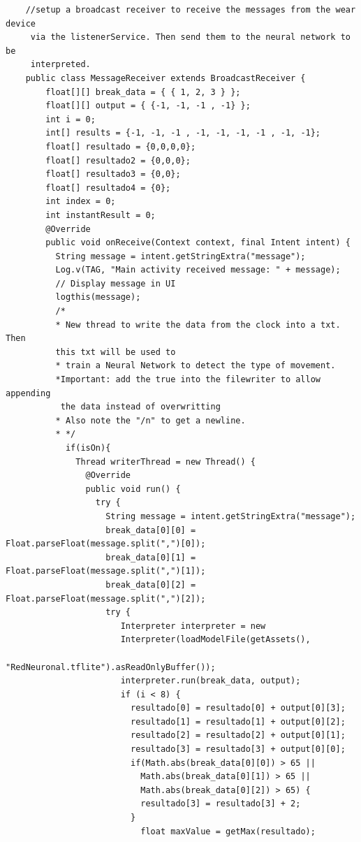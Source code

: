 \documentclass[12pt]{book}
\numberwithin{equation}{section}
\begin{document}
\begin{appendices}
\begin{verbatim}
    //setup a broadcast receiver to receive the messages from the wear device
     via the listenerService. Then send them to the neural network to be 
     interpreted.
    public class MessageReceiver extends BroadcastReceiver {
        float[][] break_data = { { 1, 2, 3 } };
        float[][] output = { {-1, -1, -1 , -1} };
        int i = 0;
        int[] results = {-1, -1, -1 , -1, -1, -1, -1 , -1, -1};
        float[] resultado = {0,0,0,0};
        float[] resultado2 = {0,0,0};
        float[] resultado3 = {0,0};
        float[] resultado4 = {0};
        int index = 0;
        int instantResult = 0;
        @Override
        public void onReceive(Context context, final Intent intent) {
          String message = intent.getStringExtra("message");
          Log.v(TAG, "Main activity received message: " + message);
          // Display message in UI
          logthis(message);
          /*
          * New thread to write the data from the clock into a txt. Then 
          this txt will be used to
          * train a Neural Network to detect the type of movement.
          *Important: add the true into the filewriter to allow appending
           the data instead of overwritting
          * Also note the "/n" to get a newline.
          * */
            if(isOn){
              Thread writerThread = new Thread() {
                @Override
                public void run() {
                  try {
                    String message = intent.getStringExtra("message");
                    break_data[0][0] = Float.parseFloat(message.split(",")[0]);
                    break_data[0][1] = Float.parseFloat(message.split(",")[1]);
                    break_data[0][2] = Float.parseFloat(message.split(",")[2]);
                    try {
                       Interpreter interpreter = new
                       Interpreter(loadModelFile(getAssets(),
                             "RedNeuronal.tflite").asReadOnlyBuffer());
                       interpreter.run(break_data, output);
                       if (i < 8) {
                         resultado[0] = resultado[0] + output[0][3];
                         resultado[1] = resultado[1] + output[0][2];
                         resultado[2] = resultado[2] + output[0][1];
                         resultado[3] = resultado[3] + output[0][0];
                         if(Math.abs(break_data[0][0]) > 65 ||
                           Math.abs(break_data[0][1]) > 65 ||
                           Math.abs(break_data[0][2]) > 65) {
                           resultado[3] = resultado[3] + 2;
                         }
                           float maxValue = getMax(resultado);

\end{verbatim}
\end{appendices}
\end{document}
